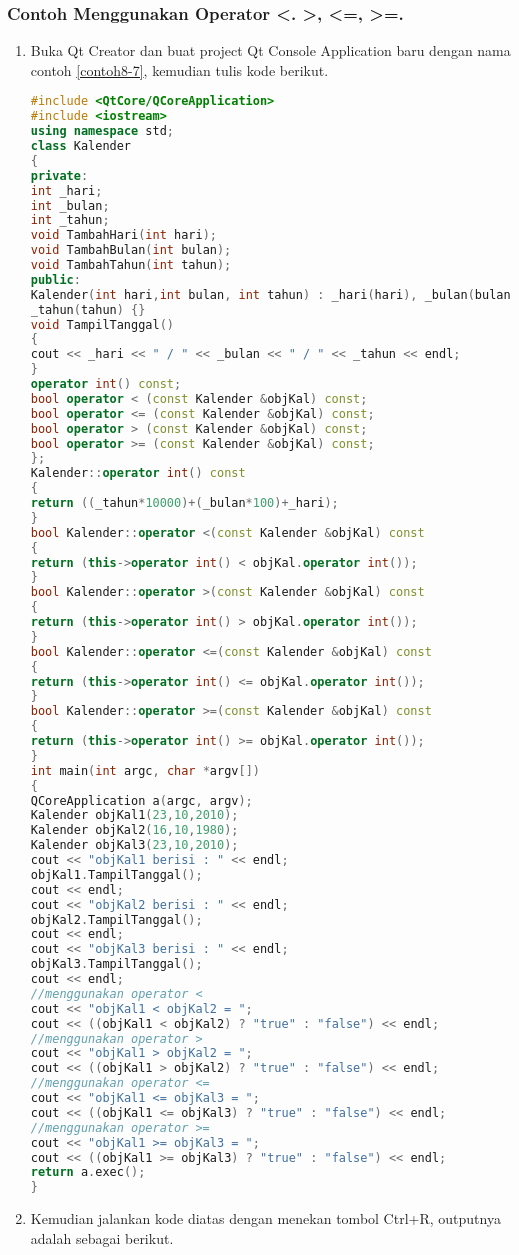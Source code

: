 \subsubsection*{Contoh  Menggunakan Operator \textless{}. \textgreater{}, \textless{}=, \textgreater{}=.}
\begin{enumerate}

\item
  Buka Qt Creator dan buat project Qt Console Application baru dengan
  nama contoh \ref{contoh8-7}, kemudian tulis kode berikut.

\begin{lstlisting}[language=c++, caption=Menggunakan Operator Overloading, label=contoh8-7]
#include <QtCore/QCoreApplication>
#include <iostream>
using namespace std;
class Kalender
{
private:
int _hari;
int _bulan;
int _tahun;
void TambahHari(int hari);
void TambahBulan(int bulan);
void TambahTahun(int tahun);
public:
Kalender(int hari,int bulan, int tahun) : _hari(hari), _bulan(bulan),
_tahun(tahun) {}
void TampilTanggal()
{
cout << _hari << " / " << _bulan << " / " << _tahun << endl;
}
operator int() const;
bool operator < (const Kalender &objKal) const;
bool operator <= (const Kalender &objKal) const;
bool operator > (const Kalender &objKal) const;
bool operator >= (const Kalender &objKal) const;
};
Kalender::operator int() const
{
return ((_tahun*10000)+(_bulan*100)+_hari);
}
bool Kalender::operator <(const Kalender &objKal) const
{
return (this->operator int() < objKal.operator int());
}
bool Kalender::operator >(const Kalender &objKal) const
{
return (this->operator int() > objKal.operator int());
}
bool Kalender::operator <=(const Kalender &objKal) const
{
return (this->operator int() <= objKal.operator int());
}
bool Kalender::operator >=(const Kalender &objKal) const
{
return (this->operator int() >= objKal.operator int());
}
int main(int argc, char *argv[])
{
QCoreApplication a(argc, argv);
Kalender objKal1(23,10,2010);
Kalender objKal2(16,10,1980);
Kalender objKal3(23,10,2010);
cout << "objKal1 berisi : " << endl;
objKal1.TampilTanggal();
cout << endl;
cout << "objKal2 berisi : " << endl;
objKal2.TampilTanggal();
cout << endl;
cout << "objKal3 berisi : " << endl;
objKal3.TampilTanggal();
cout << endl;
//menggunakan operator <
cout << "objKal1 < objKal2 = ";
cout << ((objKal1 < objKal2) ? "true" : "false") << endl;
//menggunakan operator >
cout << "objKal1 > objKal2 = ";
cout << ((objKal1 > objKal2) ? "true" : "false") << endl;
//menggunakan operator <=
cout << "objKal1 <= objKal3 = ";
cout << ((objKal1 <= objKal3) ? "true" : "false") << endl;
//menggunakan operator >=
cout << "objKal1 >= objKal3 = ";
cout << ((objKal1 >= objKal3) ? "true" : "false") << endl;
return a.exec();
}
\end{lstlisting}
\item
  Kemudian jalankan kode diatas dengan menekan tombol Ctrl+R, outputnya
  adalah sebagai berikut.
\end{enumerate}

